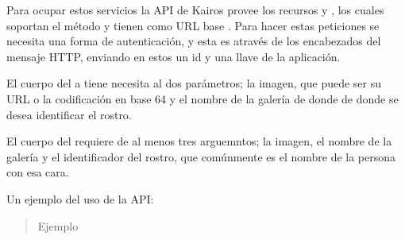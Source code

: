 \begin{fulllineitems}
\begin{fulllineitems}
Para ocupar estos servicios la API de Kairos provee los recursos  y
, los cuales soportan el método  y tienen como
URL base . Para hacer estas peticiones se
necesita una forma de autenticación, y esta es através de los encabezados
del mensaje HTTP, enviando en estos un id y una llave de la aplicación.

El cuerpo del  a  tiene necesita al dos parámetros; la
imagen, que puede ser su URL o la codificación en base 64
y el nombre de la galería de donde de donde se desea identificar el rostro.

\begin{sphinxVerbatim}[commandchars=\\\{\}]
      
      
\end{sphinxVerbatim}

El cuerpo del  requiere de al menos tres arguemntos;
la imagen, el nombre de la galería y el identificador del rostro, que
comúnmente es el nombre de la persona con esa cara.

\begin{sphinxVerbatim}[commandchars=\\\{\}]
      
      
      
\end{sphinxVerbatim}

Un ejemplo del uso de la API:
\begin{quote}\begin{description}
\item[{Ejemplo}] \leavevmode
\end{description}\end{quote}


\end{fulllineitems}
\end{fulllineitems}
